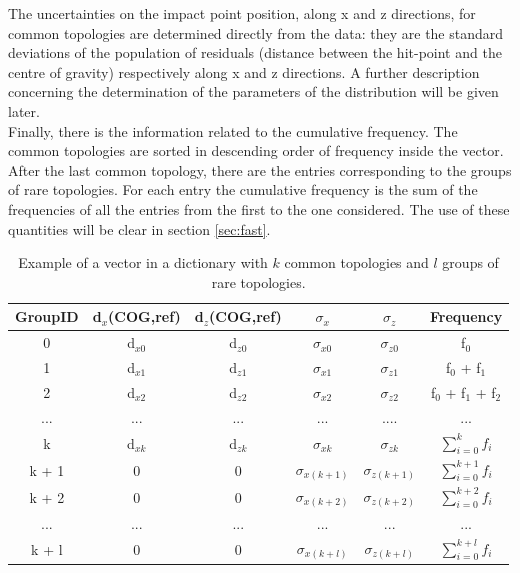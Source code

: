 The uncertainties on the impact point position, along x and z directions, for common topologies are determined directly from the data: they are the standard deviations of the population of residuals (distance between the hit-point and the centre of gravity) respectively along x and z directions. A further description concerning the determination of the parameters of the distribution will be given later.\\ 
Finally, there is the information related to the cumulative frequency. The common topologies are sorted in descending order of frequency inside the vector. After the last common topology, there are the entries corresponding to the groups of rare topologies. For each entry the cumulative frequency is the sum of the frequencies of all the entries from the first to the one considered. The use of these quantities will be clear in section \ref{sec:fast}.
%
\begin{table}
\centering
\renewcommand\arraystretch{1.5}
 \begin{tabular}{|c|c|c|c|c|c|}
  \hline
  GroupID & d$_x$(COG,ref) & d$_z$(COG,ref) & $\sigma_x$ & $\sigma_z$ & Frequency\\
  \hline
  0 & d$_{x0}$ & d$_{z0}$ & $\sigma_{x0}$ & $\sigma_{z0}$ & f$_0$\\
  1 & d$_{x1}$ & d$_{z1}$ & $\sigma_{x1}$ & $\sigma_{z1}$ & f$_0$ + f$_1$\\
  2 & d$_{x2}$ & d$_{z2}$ & $\sigma_{x2}$ & $\sigma_{z2}$ & f$_0$ + f$_1$ + f$_2$\\
  ... & ... & ... & ... & .... & ... \\
  k & d$_{xk}$ & d$_{zk}$ & $\sigma_{xk}$ & $\sigma_{zk}$ & $\sum_{i=0}^{k} f_i$ \\
  k + 1 & 0 & 0 & $\sigma_{x(k+1)}$ & $\sigma_{z(k+1)}$ & $\sum_{i=0}^{k+1} f_i$\\
  k + 2 & 0 & 0 & $\sigma_{x(k+2)}$ & $\sigma_{z(k+2)}$ & $\sum_{i=0}^{k+2} f_i$\\
  ... & ... & ... & ... & ... & ...\\
  k + l & 0 & 0 & $\sigma_{x(k+l)}$ & $\sigma_{z(k+l)}$ & $\sum_{i=0}^{k+l} f_i$\\
  \hline
 \end{tabular}
 \caption{Example of a vector in a dictionary with $k$ common topologies and $l$ groups of rare topologies.}
 \label{tab:vec}
\end{table}
%
